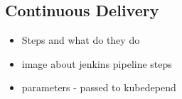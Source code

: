 \subsection{Continuous Delivery}

\begin{itemize}
	\item Steps and what do they do
	\item image about jenkins pipeline steps
	\item parameters - passed to kubedepend
\end{itemize}